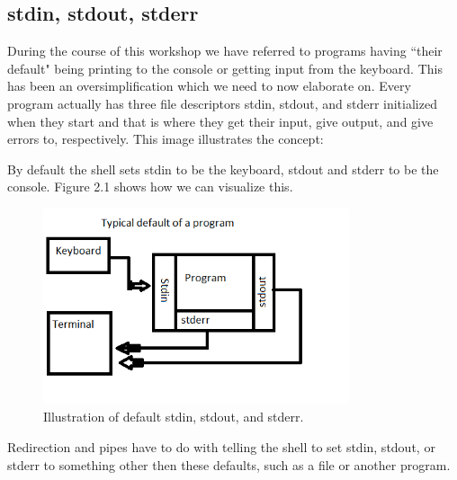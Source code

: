 \documentclass[oneside]{book}
\begin{document}
    \subsection{stdin, stdout, stderr}
        During the course of this workshop we have referred to programs having ``their default" being printing to the console or getting input from the keyboard. This has been an oversimplification which we need to now elaborate on. Every program actually has three file descriptors stdin, stdout, and stderr initialized when they start and that is where they get their input, give output, and give errors to, respectively. This image illustrates the concept:
        
        
        By default the shell sets stdin to be the keyboard, stdout and stderr to be the console. Figure 2.1 shows how we can visualize this.
        \begin{figure}
            \centering
	        \includegraphics[width=90mm]{stdin_err_out_example.png}
	        \caption{Illustration of default stdin, stdout, and stderr.}
        \end{figure}
     
         
        Redirection and pipes have to do with telling the shell to set stdin, stdout, or stderr to something other then these defaults, such as a file or another program.
\end{document}
